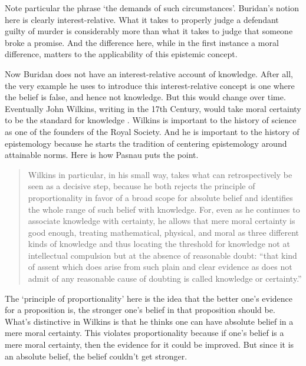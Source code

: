 \documentclass[
  11pt,
]{book}
\begin{document}
Note particular the phrase `the demands of such circumstances'. Buridan's notion here is clearly interest-relative. What it takes to properly judge a defendant guilty of murder is considerably more than what it takes to judge that someone broke a promise. And the difference here, while in the first instance a moral difference, matters to the applicability of this epistemic concept.

Now Buridan does not have an interest-relative account of knowledge. After all, the very example he uses to introduce this interest-relative concept is one where the belief is false, and hence not knowledge. But this would change over time. Eventually John Wilkins, writing in the 17th Century, would take moral certainty to be the standard for knowledge \citep[218]{Pasnau2017}. Wilkins is important to the history of science as one of the founders of the Royal Society. And he is important to the history of epistemology because he starts the tradition of centering epistemology around attainable norms. Here is how Pasnau puts the point.

\begin{quote}
Wilkins in particular, in his small way, takes what can retrospectively be seen as a decisive step, because he both rejects the principle of proportionality in favor of a broad scope for absolute belief and identifies the whole range of such belief with knowledge. For, even as he continues to associate knowledge with certainty, he allows that mere moral certainty is good enough, treating mathematical, physical, and moral as three different kinds of knowledge and thus locating the threshold for knowledge not at intellectual compulsion but at the absence of reasonable doubt: ``that kind of assent which does arise from such plain and clear evidence as does not admit of any reasonable cause of doubting is called knowledge or certainty.'' \citep[43]{Pasnau2017}
\end{quote}

The `principle of proportionality' here is the idea that the better one's evidence for a proposition is, the stronger one's belief in that proposition should be. What's distinctive in Wilkins is that he thinks one can have absolute belief in a mere moral certainty. This violates proportionality because if one's belief is a mere moral certainty, then the evidence for it could be improved. But since it is an absolute belief, the belief couldn't get stronger.
\end{document}
